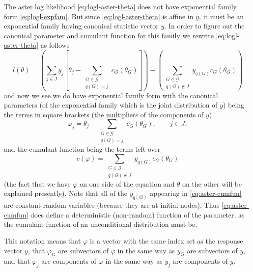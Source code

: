 The aster log likelihood \eqref{eq:logl-aster-theta} does not have
exponential family form \eqref{eq:logl-expfam}.
But since \eqref{eq:logl-aster-theta} is affine in $y$, it must be an
exponential family having canonical statistic vector $y$.  In order
to figure out the canonical parameter and cumulant function for this family
we rewrite \eqref{eq:logl-aster-theta} as follows
\begin{equation} \label{eq:logl-rewrite}
   l(\theta)
   =
   \left(
   \sum_{j \in J} y_j
   \left[ \theta_j - \sum_{\substack{G \in \mathcal{G} \\ q(G) = j}}
   c_G(\theta_G) \right]
   \right)
   -
   \left(
   \sum_{\substack{G \in \mathcal{G} \\ q(G) \notin J}}
   y_{q(G)} c_G(\theta_G) \right)
\end{equation}
and now we see we do have exponential family form with the canonical
parameters (of the exponential family which is the joint distribution of $y$)
being the terms in square brackets (the multipliers of the components of $y$)
\begin{equation} \label{eq:aster-transform}
   \varphi_j
   =
   \theta_j - \sum_{\substack{G \in \mathcal{G} \\ q(G) = j}} c_G(\theta_G),
   \qquad j \in J,
\end{equation}
and the cumulant function being the terms left over
\begin{equation} \label{eq:aster-cumfun}
   c(\varphi)
   =
   \sum_{\substack{G \in \mathcal{G} \\ q(G) \notin J}} y_{q(G)} c_G(\theta_G)
\end{equation}
(the fact that we have $\varphi$ on one side of the equation and $\theta$
on the other will be explained presently).
Note that all of the $y_{q(G)}$ appearing in \eqref{eq:aster-cumfun}
are constant random variables (because they are at initial nodes).
Thus \eqref{eq:aster-cumfun} does define a deterministic (non-random)
function of the parameter, as the cumulant function of an unconditional
distribution must be.

This notation means that $\varphi$ is a vector with the same index set as
the response vector $y$, that $\varphi_G$ are subvectors of $\varphi$
in the same way as $y_G$ are subvectors of $y$, and
that $\varphi_j$ are components of $\varphi$
in the same way as $y_j$ are components of $y$.

